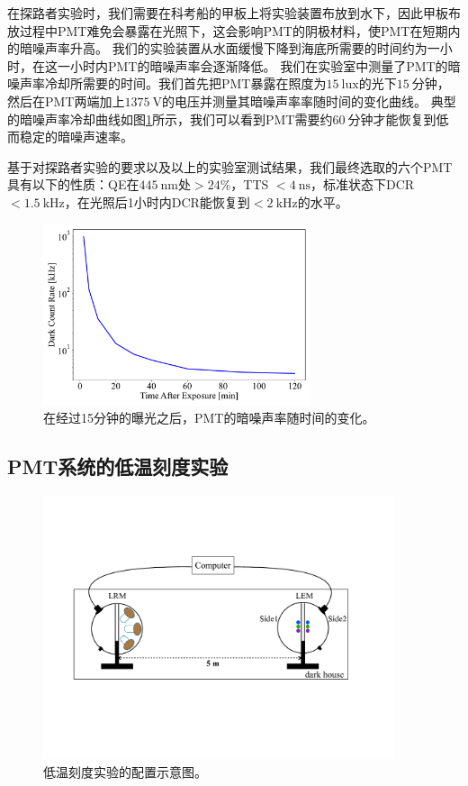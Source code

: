 在探路者实验时，我们需要在科考船的甲板上将实验装置布放到水下，因此甲板布放过程中PMT难免会暴露在光照下，这会影响PMT的阴极材料，使PMT在短期内的暗噪声率升高。
我们的实验装置从水面缓慢下降到海底所需要的时间约为一小时，在这一小时内PMT的暗噪声率会逐渐降低。
我们在实验室中测量了PMT的暗噪声率冷却所需要的时间。我们首先把PMT暴露在照度为$15~\text{lux}$的光下$15~\text{分钟}$，然后在PMT两端加上$1375~\text{V}$的电压并测量其暗噪声率率随时间的变化曲线。
典型的暗噪声率冷却曲线如图\ref{fig:exposure_time}所示，我们可以看到PMT需要约$60~\text{分钟}$才能恢复到低而稳定的暗噪声速率。

基于对探路者实验的要求以及以上的实验室测试结果，我们最终选取的六个PMT具有以下的性质：QE在$445~\text{nm}$处$>24\%$，TTS $<4~\text{ns}$，标准状态下DCR$<1.5~\text{kHz}$，在光照后1小时内DCR能恢复到$<2~\text{kHz}$的水平。

\begin{figure}[htb]
    \centering
    \includegraphics[width=0.70\textwidth]{img/pmt_dcr_after_exposure.pdf}
    \caption{在经过15分钟的曝光之后，PMT的暗噪声率随时间的变化。}
    \label{fig:exposure_time} 
\end{figure}

\subsection{PMT系统的低温刻度实验}

\begin{figure}[ht] 
    \centering
    \includegraphics[width=0.92\textwidth]{img/pmt_cold_test_setup.pdf}
    \caption{低温刻度实验的配置示意图。}
    \label{fig:pmt_cold_test_setup}
\end{figure}

